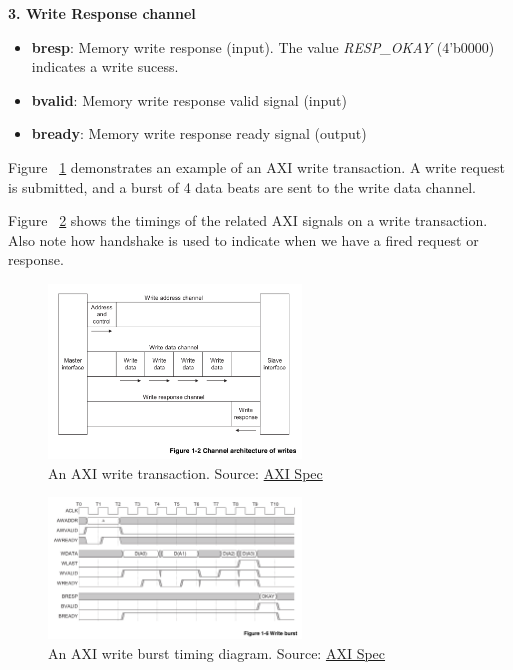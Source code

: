 \documentclass[11pt]{article}
\begin{document}
\textbf{3. Write Response channel}
\begin{itemize}
\item \textbf{bresp}: Memory write response (input). The value \textit{RESP\_OKAY} (4'b0000) indicates a write sucess.
\item \textbf{bvalid}: Memory write response valid signal (input)
\item \textbf{bready}: Memory write response ready signal (output)
\end{itemize}

Figure ~\ref{fig:axi_write} demonstrates an example of an AXI write transaction.
A write request is submitted, and a burst of 4 data beats are sent to the write data channel.

Figure ~\ref{fig:axi_write_burst} shows the timings of the related AXI signals on a write transaction. Also note how handshake is used to indicate when we have a fired request or response.

\begin{figure}[hbt]
\begin{center}
  \includegraphics[width=0.6\textwidth]{axi_write.png}
  \caption{An AXI write transaction. Source: \href{https://developer.arm.com/documentation/ihi0022/b}{AXI Spec}}
  \label{fig:axi_write}
\end{center}
\end{figure}

\begin{figure}[hbt]
\begin{center}
  \includegraphics[width=0.6\textwidth]{axi_write_burst.png}
  \caption{An AXI write burst timing diagram. Source: \href{https://developer.arm.com/documentation/ihi0022/b}{AXI Spec}}
  \label{fig:axi_write_burst}
\end{center}
\end{figure}
\end{document}
